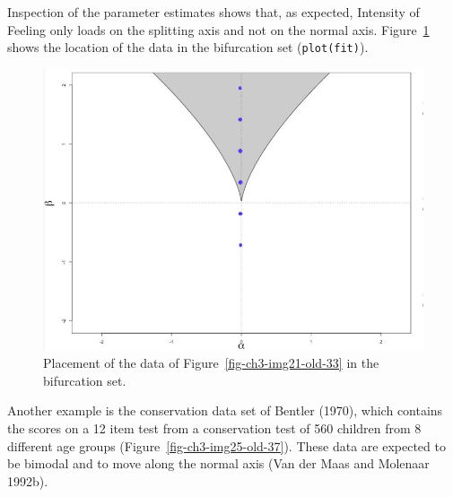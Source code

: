 \documentclass[
  a4paper,
  DIV=11,
  numbers=noendperiod,
  oneside]{scrreprt}
\begin{document}
Inspection of the parameter estimates shows that, as expected, Intensity
of Feeling only loads on the splitting axis and not on the normal axis.
Figure~\ref{fig-ch3-img24-old-36} shows the location of the data in the
bifurcation set (\texttt{plot(fit)}).

\begin{figure}

{\centering \includegraphics{media/ch3/image24.jpg}

}

\caption{\label{fig-ch3-img24-old-36}Placement of the data of
Figure~\ref{fig-ch3-img21-old-33} in the bifurcation set.}

\end{figure}

Another example is the conservation data set of Bentler (1970), which
contains the scores on a 12 item test from a conservation test of 560
children from 8 different age groups
(Figure~\ref{fig-ch3-img25-old-37}). These data are expected to be
bimodal and to move along the normal axis (Van der Maas and Molenaar
1992b).
\end{document}
